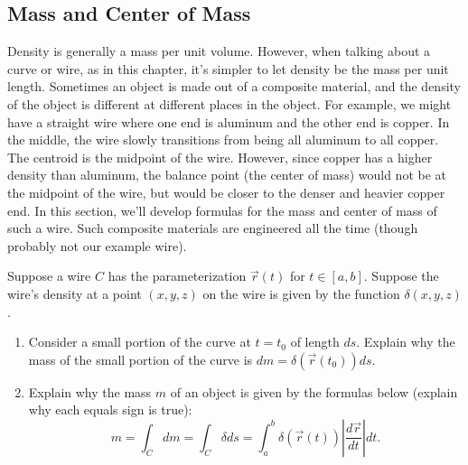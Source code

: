 \subsection{Mass and Center of Mass}
Density is generally a mass per unit volume.  However, when talking about a curve or wire, as in this chapter, it's simpler to let density be the mass per unit length.  Sometimes an object is made out of a composite material, and the density of the object is different at different places in the object. For example, we might have a straight wire where one end is aluminum and the other end is copper. In the middle, the wire slowly transitions from being all aluminum to all copper.  The centroid is the midpoint of the wire.  However, since copper has a higher density than aluminum, the balance point (the center of mass) would not be at the midpoint of the wire, but would be closer to the denser and heavier copper end.  In this section, we'll develop formulas for the mass and center of mass of such a wire. Such composite materials are engineered all the time (though probably not our example wire).  

\begin{problem}[Mass]\label{mass of curve}%
%
 Suppose a wire $C$ has the parameterization $\vec r(t)$ for $t\in[a,b]$.  Suppose the wire's density at a point $(x,y,z)$ on the wire is given by the function $\delta(x,y,z)$. 
 \begin{enumerate}
  \item Consider a small portion of the curve at $t=t_0$ of length $ds$.  Explain why the mass of the small portion of the curve is $dm=\delta(\vec r(t_0)) ds$.
  \item Explain why the mass $m$ of an object is given by the formulas below (explain why each equals sign is true):
$$m=\int_C dm = \int_C \delta ds = \int_a^b \delta(\vec r(t)) \left|\frac{d\vec r}{dt}\right|dt.$$
 \end{enumerate}
\end{problem}

